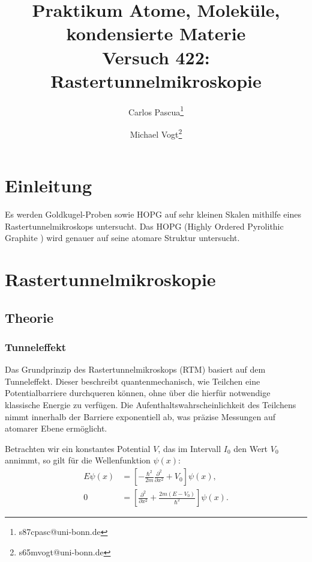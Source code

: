 \documentclass{article}
\title{Praktikum Atome, Moleküle, kondensierte Materie \\ Versuch 422: Rastertunnelmikroskopie}
\author[1]{Carlos Pascua\thanks{s87cpasc@uni-bonn.de}}
\author[1]{Michael Vogt\thanks{s65mvogt@uni-bonn.de}}
\affil[1]{Uni Bonn}
\newcommand{\defc}{black}
\newcommand{\colorT}[2][blue]{\color{#1}{#2}\color{\defc}}
\newcommand{\todo}[1]{\colorT[red]{\textbf{(#1)}}}
\begin{document}
\maketitle
\tableofcontents
\newpage
{}

\pagestyle{fancy}
\fancyhead[R]{\thepage}
\fancyhead[L]{\leftmark}

\section*{Einleitung}
Es werden Goldkugel-Proben sowie HOPG auf sehr kleinen Skalen mithilfe eines Rastertunnelmikroskops untersucht.
Das HOPG (Highly Ordered Pyrolithic Graphite \cite{Anleitung}) wird genauer auf seine atomare Struktur untersucht.

\section{Rastertunnelmikroskopie}
\subsection{Theorie}

\subsubsection*{Tunneleffekt} 
Das Grundprinzip des Rastertunnelmikroskops (RTM) basiert auf dem Tunneleffekt. Dieser beschreibt quantenmechanisch, wie Teilchen eine Potentialbarriere durchqueren können, ohne über die hierfür notwendige klassische Energie zu verfügen. Die Aufenthaltswahrscheinlichkeit des Teilchens nimmt innerhalb der Barriere exponentiell ab, was präzise Messungen auf atomarer Ebene ermöglicht.

Betrachten wir ein konstantes Potential \( V \), das im Intervall \( I_0 \) den Wert \( V_0 \) annimmt, so gilt für die Wellenfunktion \( \psi(x) \): 
\begin{align*}
    E \psi(x) &= \left[ - \frac{\hbar^2}{2m} \frac{\partial^2}{\partial x^2} + V_0 \right] \psi(x), \\
    0 &= \left[ \frac{\partial^2}{\partial x^2} + \frac{2m(E - V_0)}{\hbar^2} \right] \psi(x).
\end{align*}
\end{document}
